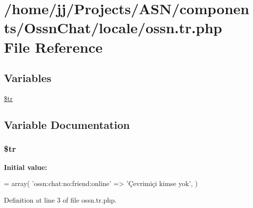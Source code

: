\hypertarget{components_2_ossn_chat_2locale_2ossn_8tr_8php}{}\section{/home/jj/\+Projects/\+A\+S\+N/components/\+Ossn\+Chat/locale/ossn.tr.\+php File Reference}
\label{components_2_ossn_chat_2locale_2ossn_8tr_8php}
\subsection*{Variables}
\begin{DoxyCompactItemize}
\item 
\hyperlink{components_2_ossn_chat_2locale_2ossn_8tr_8php_a925f466a276b200c71b2567d39b4dba7}{\$tr}
\end{DoxyCompactItemize}


\subsection{Variable Documentation}
\subsubsection[{\texorpdfstring{\$tr}{$tr}}]{\setlength{\rightskip}{0pt plus 5cm}\$tr}\hypertarget{components_2_ossn_chat_2locale_2ossn_8tr_8php_a925f466a276b200c71b2567d39b4dba7}{}\label{components_2_ossn_chat_2locale_2ossn_8tr_8php_a925f466a276b200c71b2567d39b4dba7}
{\bfseries Initial value\+:}
\begin{DoxyCode}
= array(
    \textcolor{stringliteral}{'ossn:chat:no:friend:online'} => \textcolor{stringliteral}{'Çevrimiçi kimse yok'},
)
\end{DoxyCode}


Definition at line 3 of file ossn.\+tr.\+php.

